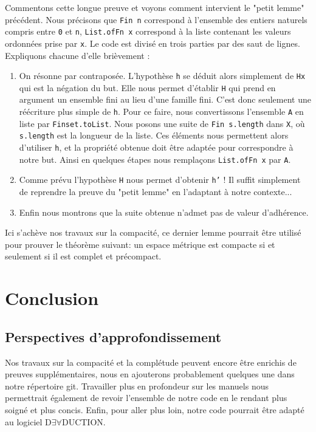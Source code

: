 \documentclass[a4paper, 12pt]{article}
\newcommand{\lean}[1]{\texttt{#1}}
\begin{document}
\begin{itemize}
Commentons cette longue preuve et voyons comment intervient le "petit lemme" précédent. Nous précisons que \lean{Fin n} correspond à l'ensemble des entiers naturels compris entre \lean{0} et \lean{n}, \lean{List.ofFn x} correspond à la liste contenant les valeurs ordonnées prise par \lean{x}. Le code est divisé en trois parties par des saut de lignes. Expliquons chacune d'elle brièvement :

\begin{enumerate}
    \item On résonne par contraposée. L'hypothèse \lean{h} se déduit alors simplement de \lean{Hx} qui est la négation du but. Elle nous permet d'établir \lean{H} qui prend en argument un ensemble fini au lieu d'une famille fini. C'est donc seulement une réécriture plus simple de \lean{h}. Pour ce faire, nous convertissons l'ensemble \lean{A} en liste par \lean{Finset.toList}. Nous posons une suite de \lean{Fin s.length} dans \lean{X}, où \lean{s.length} est la longueur de la liste. Ces éléments nous permettent alors d'utiliser \lean{h}, et la propriété obtenue doit être adaptée pour correspondre à notre but. Ainsi en quelques étapes nous remplaçons \lean{List.ofFn x} par \lean{A}.
    \item Comme prévu l'hypothèse \lean{H} nous permet d'obtenir \lean{h'} ! Il suffit simplement de reprendre la preuve du "petit lemme" en l'adaptant à notre contexte...
    \item Enfin nous montrons que la suite obtenue n'admet pas de valeur d'adhérence.
\end{enumerate}

Ici s'achève nos travaux sur la compacité, ce dernier lemme pourrait être utilisé pour prouver le théorème suivant: un espace métrique est compacte si et seulement si il est complet et précompact.

\newpage
\section{Conclusion}

\subsection{Perspectives d’approfondissement}

Nos travaux sur la compacité et la complétude peuvent encore être enrichis de preuves supplémentaires, nous en ajouterons probablement quelques une dans notre répertoire git. Travailler plus en profondeur sur les manuels nous permettrait également de revoir l’ensemble de notre code en le rendant plus soigné et plus concis. Enfin, pour aller plus loin, notre code pourrait être adapté au logiciel D$\exists\forall$DUCTION.



\end{itemize}
\end{document}
